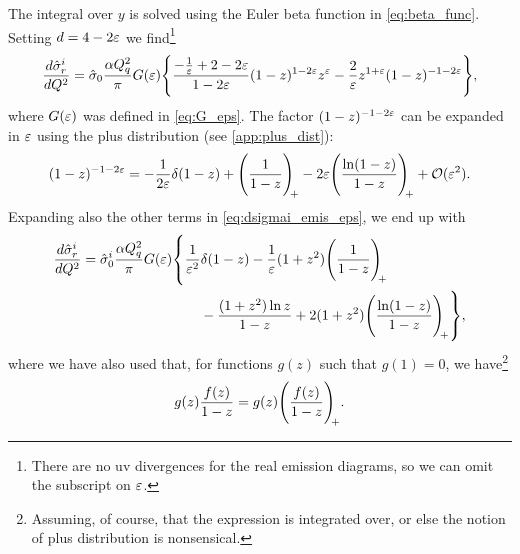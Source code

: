 The integral over $y$ is solved using the Euler beta function in \cref{eq:beta_func}. Setting $d=4-2\varepsilon$ we find\footnote{There are no \gls{uv} divergences for the real emission diagrams, so we can omit the subscript on $\varepsilon$.}
\begin{equation}
    \frac{d\hat\sigma^i_r}{dQ^2} = \hat\sigma_0 \frac{\alpha Q_q^2}{\pi} G(\varepsilon) 
    \Biggl\{
        \frac{-\frac{1}{\varepsilon}+2 - 2\varepsilon}{1-2\varepsilon}(1-z)^{1-2\varepsilon}z^\varepsilon
        - \frac{2}{\varepsilon} z^{1+\varepsilon} (1-z)^{-1-2\varepsilon}
    \Biggr\},
    \label{eq:dsigmai_emis_eps}
\end{equation}
where $G(\varepsilon)$ was defined in \cref{eq:G_eps}. The factor $(1-z)^{-1-2\varepsilon}$ can be expanded in $\varepsilon$ using the plus distribution (see \cref{app:plus_dist}):
\begin{equation}
    (1-z)^{-1-2\varepsilon} = -\frac{1}{2\varepsilon} \delta(1-z) + \Biggl( \frac{1}{1-z} \Biggr)_{\!\!+} - 2\varepsilon \Biggl( \frac{\ln(1-z)}{1-z} \Biggr)_{\!\!+} + \mathcal{O}(\varepsilon^2).
    \label{eq:1-z_plusdist_expansion}
\end{equation}
Expanding also the other terms in \cref{eq:dsigmai_emis_eps}, we end up with
\begin{equation}
\begin{split}
    \frac{d\hat\sigma^i_r}{dQ^2} = \hat\sigma^i_0 \frac{\alpha Q_q^2}{\pi} G(\eps)
    &\vastl\{
        \frac{1}{\eps^2} \delta(1-z)
        - \frac{1}{\eps} (1+z^2) \plusdist
        \\ &\qquad
        - \frac{(1+z^2) \ln z}{1-z}
        + 2(1+z^2) \plusdistln
    \vastr\},
\end{split}
\label{eq:dsigmai_emis}
\end{equation}
where we have also used that, for functions $g(z)$ such that $g(1)=0$, we have\footnote{Assuming, of course, that the expression is integrated over, or else the notion of plus distribution is nonsensical.}
\begin{equation}
    g(z) \frac{f(z)}{1-z} = g(z) \Biggl( \frac{f(z)}{1-z} \Biggr)_{\!\!+}.
    \label{eq:g_1-z_plusdist_relation}
\end{equation}

